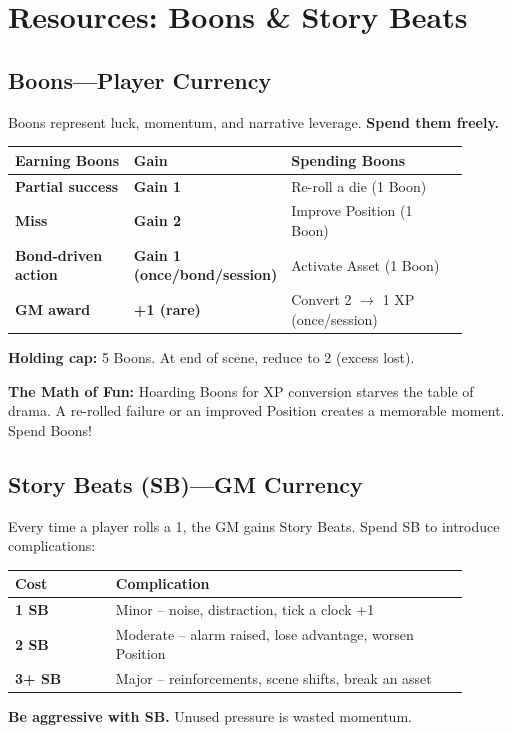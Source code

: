\documentclass[10pt]{article}
\begin{document}
\section{Resources: Boons \& Story Beats}

\subsection{Boons—Player Currency}
Boons represent luck, momentum, and narrative leverage. \textbf{Spend them freely.}
\begin{coretable}
\begin{tabular}{>{\bfseries}p{0.3\linewidth} >{\bfseries}p{0.15\linewidth} p{0.45\linewidth}}
\toprule
\textbf{Earning Boons} & \textbf{Gain} & \textbf{Spending Boons} \\
\midrule
Partial success & Gain 1 & Re-roll a die (1 Boon) \\
Miss & Gain 2 & Improve Position (1 Boon) \\
Bond-driven action & Gain 1 (once/bond/session) & Activate Asset (1 Boon) \\
GM award & +1 (rare) & Convert 2 $\to$ 1 XP (once/session) \\
\bottomrule
\end{tabular}
\end{coretable}
\textbf{Holding cap:} 5 Boons. At end of scene, reduce to 2 (excess lost).

\begin{sidebar}
    \textbf{The Math of Fun:} Hoarding Boons for XP conversion starves the table of drama. A re-rolled failure or an improved Position creates a memorable moment. Spend Boons!
\end{sidebar}

\subsection{Story Beats (SB)—GM Currency}
Every time a player rolls a 1, the GM gains Story Beats. Spend SB to introduce complications:
\begin{coretable}
\begin{tabular}{>{\bfseries}p{0.2\linewidth} p{0.7\linewidth}}
\toprule
\textbf{Cost} & \textbf{Complication} \\
\midrule
1 SB & Minor – noise, distraction, tick a clock +1 \\
2 SB & Moderate – alarm raised, lose advantage, worsen Position \\
3+ SB & Major – reinforcements, scene shifts, break an asset \\
\bottomrule
\end{tabular}
\end{coretable}
\textbf{Be aggressive with SB.} Unused pressure is wasted momentum.
\end{document}
